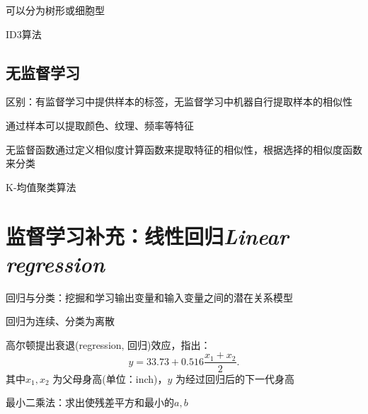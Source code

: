 可以分为树形或细胞型
\begin{center}
\end{center}
\begin{eg}
    ID3算法
\end{eg}
\subsection{无监督学习}%
\label{sub:无监督学习}
\begin{notation}
    区别：有监督学习中提供样本的标签，无监督学习中机器自行提取样本的相似性
\end{notation}
通过样本可以提取颜色、纹理、频率等特征

无监督函数通过定义相似度计算函数来提取特征的相似性，根据选择的相似度函数来分类
\begin{notation}
    K-均值聚类算法
\end{notation}
\section*{监督学习补充：线性回归\textit{Linear regression} }%
\label{sec:监督学习补充：线性回归}
\begin{defi}
    回归与分类：挖掘和学习输出变量和输入变量之间的潜在关系模型

    回归为连续、分类为离散
\end{defi}
\begin{eg}
    高尔顿提出衰退(regression, 回归)效应，指出：\[
        y=33.73+0.516 \frac{x_1+x_2}{2} 
    .\] 
    其中$x_1,x_2$ 为父母身高(单位：inch)，$y$ 为经过回归后的下一代身高
\end{eg}
\begin{notation}
    最小二乘法：求出使残差平方和最小的$a,b$
\end{notation}




